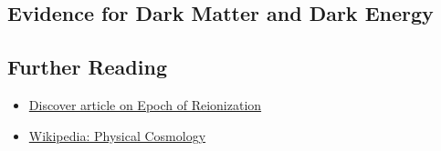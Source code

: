 \subsection{Evidence for Dark Matter and Dark Energy}

\subsection{Further Reading}
\begin{itemize}
\item \href{http://discovermagazine.com/2014/april/12-first-light}{Discover article on Epoch of Reionization}
\item \href{http://en.wikipedia.org/wiki/Physical_cosmology}{Wikipedia: Physical Cosmology}
\end{itemize}


